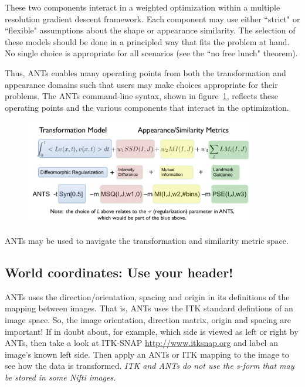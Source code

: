 \documentclass{InsightArticle}
\begin{document}
These two components interact in a weighted optimization within a multiple resolution gradient descent framework. Each component may use either ``strict" or ``flexible" assumptions about the shape or appearance similarity. The selection of these models should be done in a principled way that fits the problem at hand. No single choice is appropriate for all scenarios (see the ``no free lunch" theorem). 

Thus, ANTs enables many operating points from both the transformation and appearance domains such that users may make choices appropriate for their problems. The ANTs command-line syntax, shown in figure~\ref{fig:cmd}, reflects these operating points and the various components that interact in the optimization.
\begin{figure}
\includegraphics[width=0.9\textwidth]{Figures/ANTSSyntax.pdf} 
\vspace{-0.1in}
\label{fig:cmd}
\end{figure}
ANTs may be used to navigate the transformation and similarity metric space. 

\subsection{World coordinates: Use your header!} ANTs uses the direction/orientation, spacing
and origin in its definitions of the mapping between images.  That is,
ANTs uses the ITK standard defintions of an image space.  So, the
image orientation, direction matrix, origin and spacing are important!
If in doubt about, for example, which side is viewed as left or right
by ANTs, then take a look at ITK-SNAP \href{http://www.itksnap.org}{http://www.itksnap.org} and label an image's known left
side.  Then apply an ANTs or ITK mapping to the image to see how the
data is transformed.  \textit{ITK and ANTs do not use the s-form that
  may be stored in some Nifti images.}
\end{document}
